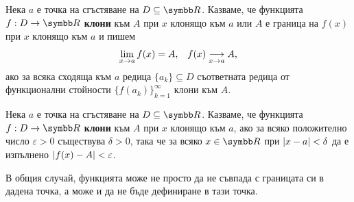 \documentclass[numbers=endperiod, bibliography=totocnumbered]{scrartcl}
\begin{document}
\begin{definition}
  Нека \( a \) е точка на сгъстяване на \( D \subseteq \R \). Казваме, че функцията \( f: D \to \R \) \textbf{клони} към \( A \) при \( x \) клонящо към \( a \) или \( A \) е граница на \( f(x) \) при \( x \) клонящо към \( a \) и пишем
  \begin{align*}
    \lim_{x \to a} f(x) = A,
    &&
    f(x) \Conv[x \to a]{} A,
  \end{align*}
  ако за всяка сходяща към \( a \) редица \( \{ a_k \} \subseteq D \) съответната редица от функционални стойности \( {\{ f(a_k) \}}_{k=1}^\infty \) клони към \( A \).
\end{definition}

\begin{definition}
  Нека \( a \) е точка на сгъстяване на \( D \subseteq \R \). Казваме, че функцията \( f: D \to \R \) \textbf{клони} към \( A \) при \( x \) клонящо към \( a \), ако за всяко положително число \( \varepsilon > 0 \) съществува \( \delta > 0 \), така че за всяко \( x \in \R \) при \( \Abs{x - a} < \delta \) да е изпълнено \( \Abs{f(x) - A} < \varepsilon \).
\end{definition}

\begin{remark}
  В общия случай, функцията може не просто да не съвпада с границата си в дадена точка, а може и да не бъде дефиниране в тази точка.
\end{remark}
\end{document}
